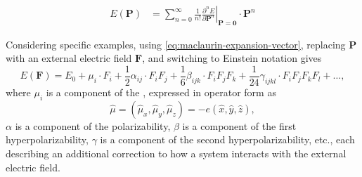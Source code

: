 \documentclass[%
class = book,%
crop = false,%
float = true,%
multi = true,%
preview = false,%
]{standalone}
\begin{document}
\begin{equation}
  \label{eq:maclaurin-expansion-vector}
  \begin{aligned}
    E(\mathbf{P}) &= \sum_{n = 0}^{\infty} \frac{1}{n!} \left. \frac{\partial^{n} E}{\partial \mathbf{P}^{n}} \right|_{\mathbf{P} = \mathbf{0}} \cdot \mathbf{P}^{n}%
  \end{aligned}
\end{equation}

Considering specific examples, using \eqref{eq:maclaurin-expansion-vector}, replacing \(\mathbf{P}\) with an external electric field \(\mathbf{F}\), and switching to Einstein notation gives
\begin{equation}
  \label{eq:electric-field-expansion}
  E(\mathbf{F}) = E_{0} + \mu_{i} \cdot F_{i} + \frac{1}{2} \alpha_{ij} \cdot F_{i}F_{j} + \frac{1}{6} \beta_{ijk} \cdot F_{i}F_{j}F_{k} + \frac{1}{24} \gamma_{ijkl} \cdot F_{i}F_{j}F_{k}F_{l} + \dots,
\end{equation}
where \(\mu_{i}\) is a component of the \href{https://chemistry.stackexchange.com/a/74733/194}{\color{black}{dipole (moment)}}, expressed in operator form as
\begin{equation}
  \label{eq:dipole-operator}
  \hat{\mu} = (\hat{\mu}_{x}, \hat{\mu}_{y}, \hat{\mu}_{z}) = -e(\hat{x}, \hat{y}, \hat{z}),
\end{equation}
\(\alpha\) is a component of the polarizability, \(\beta\) is a component of the first hyperpolarizability, \(\gamma\) is a component of the second hyperpolarizability, etc., each describing an additional correction to how a system interacts with the external electric field.
\end{document}
